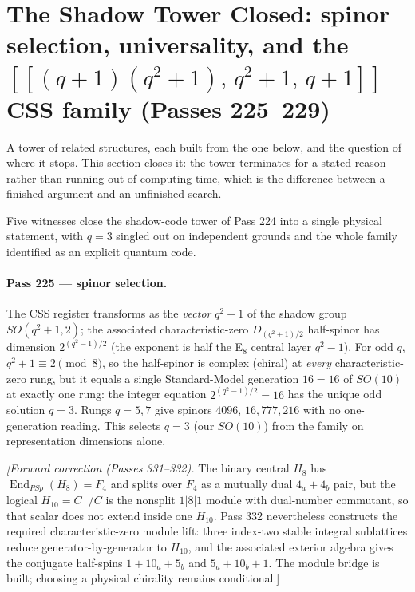 \documentclass[12pt,a4paper]{article}
\def\mathrm#1{#1}%
\def\mathbf#1{#1}%
\theoremstyle{definition}
\newcommand{\PSp}{\mathrm{PSp}}
\begin{document}
\section{The Shadow Tower Closed: spinor selection, universality, and the $[[(q{+}1)(q^2{+}1),\,q^2{+}1,\,q{+}1]]$ CSS family (Passes 225--229)}

\begin{plainbox}
A tower of related structures, each built from the one below, and the question of
where it stops. This section closes it: the tower terminates for a stated reason rather than
running out of computing time, which is the difference between a finished argument and an
unfinished search.
\end{plainbox}

Five witnesses close the shadow-code tower of Pass 224 into a single physical
statement, with $q=3$ singled out on independent grounds and the whole family
identified as an explicit quantum code.

\paragraph{Pass 225 --- spinor selection.} The CSS register transforms as the
\emph{vector} $q^2+1$ of the shadow group $\mathrm{SO}(q^2+1,2)$; the associated
characteristic-zero $D_{(q^2+1)/2}$ half-spinor
has dimension $2^{(q^2-1)/2}$ (the exponent is half the E$_8$ central layer
$q^2-1$). For odd $q$, $q^2+1\equiv 2\pmod 8$, so the half-spinor is complex
(chiral) at \emph{every} characteristic-zero rung, but it equals a single Standard-Model generation
$16=\mathbf{16}$ of $\mathrm{SO}(10)$ at exactly one rung: the integer equation
$2^{(q^2-1)/2}=16$ has the unique odd solution $q=3$. Rungs $q=5,7$ give
spinors $4096,\,16{,}777{,}216$ with no one-generation reading. This selects
$q=3$ (our $\mathrm{SO}(10)$) from the family on representation dimensions alone.

\emph{[Forward correction (Passes 331--332).} The binary central $H_8$ has
$\operatorname{End}_{\PSp}(H_8)=\mathbf F_4$ and splits over $\mathbf F_4$ as a
mutually dual $4_a+4_b$ pair, but the logical $H_{10}=C^\perp/C$ is the nonsplit
$1|8|1$ module with dual-number commutant, so that scalar does not extend inside
one $H_{10}$. Pass 332 nevertheless constructs the required characteristic-zero
module lift: three index-two stable integral sublattices reduce
generator-by-generator to $H_{10}$, and the associated exterior algebra gives
the conjugate half-spins $1+10_a+5_b$ and $5_a+10_b+1$. The module bridge is
built; choosing a physical chirality remains conditional.]
\end{document}
